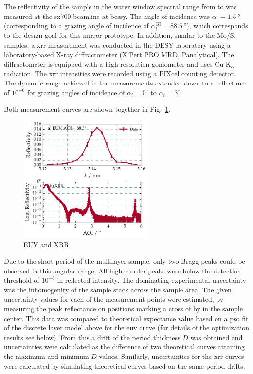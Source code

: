 The reflectivity of the sample in the water window spectral range from  to  was measured at the \gls{sx700} beamline at \gls{bessy}. The angle of incidence was $\alpha_i=\SI{1.5}{\degree}$ (corresponding to a grazing angle of incidence of $\alpha_i^\text{GI} = \SI{88.5}{\degree}$), which corresponds to the design goal for this mirror prototype. In addition, similar to the Mo/Si samples, a \gls{xrr} measurement was 
conducted in the DESY laboratory using a laboratory-based X-ray diffractometer 
(X'Pert PRO MRD, Panalytical). The diffractometer is equipped with a high-resolution goniometer and uses Cu-K$_\alpha$ radiation. The \gls{xrr} intensities were recorded using a PIXcel counting detector. The dynamic range achieved in the measurements 
extended down to a reflectance of $10^{-6}$ for grazing angles of incidence of 
$\alpha_i=0^\circ$ to $\alpha_i=3^\circ$.

Both measurement curves are shown together in Fig.~\ref{ch_spec:fig_CrSc_EUV_XRR_data}.
\begin{figure}[htbp]
  \centering
  \includegraphics[width=0.6\textwidth]{img/CrSc_EUV_XRR_data}
  \caption{EUV and XRR}
  \label{ch_spec:fig_CrSc_EUV_XRR_data}
\end{figure}
Due to the short period of the multilayer sample, only two Bragg peaks could be observed in this angular range. All higher order peaks were below the detection threshold of $10^{-6}$ in reflected intensity. The dominating experimental uncertainty was the inhomogenity of the sample stack across the sample area. The given uncertainty values for each of the measurement points were estimated, by measuring the peak reflectance on positions marking a cross of  by  in the sample center. This data was compared to theoretical expectance value based on a \gls{pso} fit of the discrete layer model above for the \gls{euv} curve (for details of the optimization results see below). From this a drift of the period thickness $D$ was obtained and uncertainties were calculated as the difference of two theoretical curves attaining the maximum and minimum $D$ values. Similarly, uncertainties for the \gls{xrr} curves were calculated by simulating theoretical curves based on the same period drifts.

